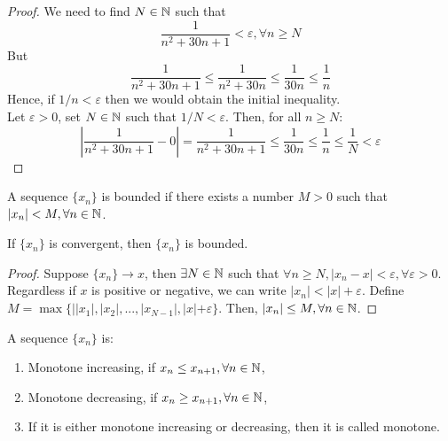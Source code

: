 \begin{proof}
    We need to find $N \in \mathbb{N}$ such that
    \begin{equation*}
        \frac{1}{n^2 + 30n + 1} < \varepsilon, \forall n \geq N
    \end{equation*}
    But
    \begin{equation*}
        \frac{1}{n^2 + 30n + 1} \leq \frac{1}{n^2 + 30n} \leq \frac{1}{30n} \leq \frac{1}{n}
    \end{equation*}
    Hence, if $1/n < \varepsilon$ then we would obtain the initial inequality. \\
    Let $\varepsilon > 0$, set $N \in \mathbb{N}$ such that $1/N < \varepsilon$. Then, for all $n \geq N$:
    \begin{equation*}
        \left| \frac{1}{n^2+30n+1} - 0\right| = \frac{1}{n^2+30n+1} \leq  \frac{1}{30n} \leq \frac{1}{n} \leq \frac{1}{N} < \varepsilon
    \end{equation*}
\end{proof}

\begin{definition}
    A sequence $\{x_n\}$ is bounded if there exists a number $M > 0$ such that $|x_n| < M, \forall n \in \mathbb{N}$.
\end{definition}

\begin{theorem}
    If $\{ x_n\}$ is convergent, then $\{ x_n\}$ is bounded.
\end{theorem}

\begin{proof}
    Suppose $\{ x_n\} \to x$, then $\exists N \in \mathbb{N}$ such that $\forall n \geq N, |x_n - x| < \varepsilon, \forall \varepsilon > 0$. Regardless if $x$ is positive or negative, we can write $|x_n| < |x| + \varepsilon$. Define $M = \max \{||x_1|, |x_2|, ..., |x_{N-1}|, |x| + \varepsilon \}$. Then, $|x_n| \leq M, \forall n \in \mathbb{N}$. 
\end{proof}

\begin{definition}
    A sequence $\{ x_n \}$ is:
    \begin{enumerate}
        \item Monotone increasing, if $x_n \leq x_{n+1}, \forall n \in \mathbb{N}$,
        \item Monotone decreasing, if $x_n \geq x_{n+1}, \forall n \in \mathbb{N}$,
        \item If it is either monotone increasing or decreasing, then it is called monotone.
    \end{enumerate}
\end{definition}

